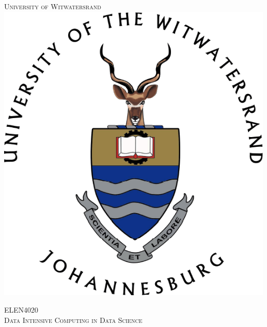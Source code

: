 \documentclass[10pt, conference]{IEEEtran}
\begin{document}
\begin{titlepage}
\newcommand{\HRule}{\rule{\linewidth}{0.5mm}} %

\center %
 

\textsc{\LARGE University of Witwatersrand}\\[1.5cm] %

\includegraphics[scale=0.25]{Wits.png}%
 
 
\textsc{\Large ELEN4020}\\[0.5cm] %
\textsc{\large Data Intensive Computing in Data Science}\\[0.5cm] %




\end{titlepage}
\end{document}
